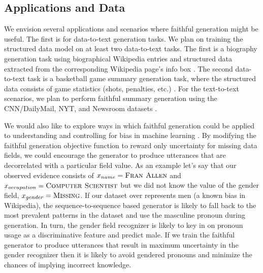
 \subsection{Applications and Data}
We envision several applications and scenarios where faithful generation might
be useful. The first is for data-to-text generation tasks. We plan on 
training the structured data model on at least two data-to-text tasks. 
The first is a biography generation task using biographical Wikipedia
entries and structured data extracted from the corresponding Wikipedia page's
info box \citep{lebret2016neural}. The second data-to-text task is a 
basketball game summary generation task, where the structured data consists
of game statistics (shots, penalties, etc.) \citep{wiseman2017challenges}.
For the text-to-text scenarios, we plan to perform faithful summary generation
using the CNN/DailyMail,
NYT, and Newsroom datasets 
\citep{hermann2015teaching,sandhaus2008new,grusky2018newsroom}.


We would also like to explore ways in which faithful generation could 
be applied to understanding and controlling for bias in machine learning
\citep{bolukbasi2016man}. By modifying the faithful generation objective
function to reward only uncertainty for missing data fields, we could 
encourage the generator to produce utterances that are decorrelated with 
a particular field value. 
As an example let's say that our observed evidence consists
of $x_{name} = \textsc{Fran Allen}$ and  
$x_{occupation} = \textsc{Computer Scientist}$
but we did not know the value of the gender field, 
$x_{gender} = \textsc{Missing} $. If our dataset over 
represents men (a known bias in Wikipedia), 
the sequence-to-sequence based generator is 
likely to fall back to the most prevalent patterns in the dataset and use
the masculine pronoun during generation. In turn, 
the gender field recognizer is likely
to key in on pronoun usage as a discriminative feature and predict male.
If we train the faithful generator to produce utterances that result in
maximum uncertainty in the gender 
recognizer then it is likely to avoid gendered pronouns and minimize
the chances of implying incorrect knowledge.
